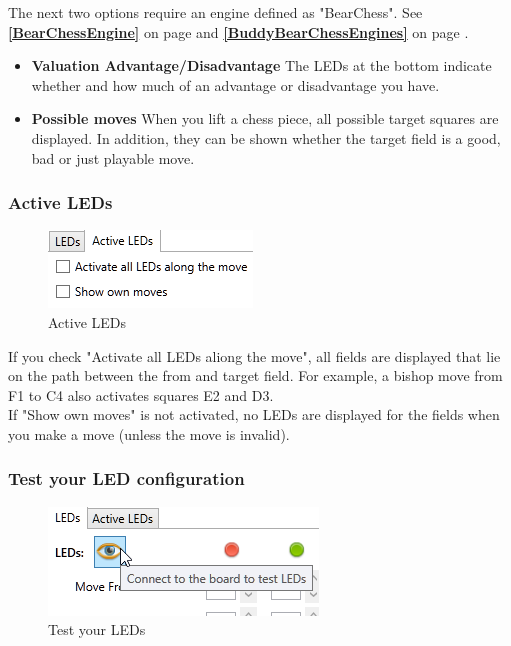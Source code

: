 \documentclass[11pt,a4paper]{article}
\begin{document}
The next two options require an engine defined as "BearChess". See \textbf{\ref{BearChessEngine}  } on page \pageref{BearChessEngine} and \textbf{\ref{BuddyBearChessEngines}  } on page \pageref{BuddyBearChessEngines}.

\begin{itemize}
	\item \textbf{Valuation Advantage/Disadvantage} The LEDs at the bottom indicate whether and how much of an advantage or disadvantage you have.
	\item \textbf{Possible moves} When you lift a chess piece, all possible target squares are displayed. In addition, they can be shown whether the target field is a good, bad or just playable move.
\end{itemize}



\subsubsection{Active LEDs}

\begin{figure}[H]
	\centering
	\includegraphics[scale=1.0]{iChessOne4.png}
	\caption{Active LEDs }
	\label{fig:iChessOne7}
\end{figure}
If you check "Activate all LEDs aliong the move", all fields are displayed that lie on the path between the from and target field. For example, a bishop move from F1 to C4 also activates squares E2 and D3.\\
If "Show own moves" is not activated, no LEDs are displayed for the fields when you make a move (unless the move is invalid).

\subsubsection{Test your LED configuration}

\begin{figure}[H]
	\centering
	\includegraphics[scale=1.0]{iChessOne5.png}
	\caption{Test your LEDs }
	\label{fig:iChessOne8}
\end{figure}
\end{document}
